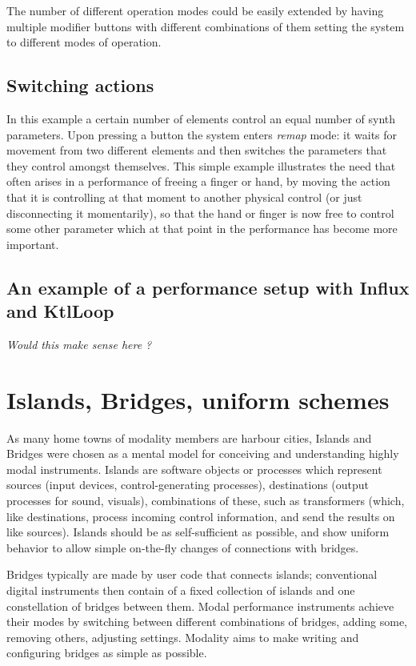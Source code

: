 \documentclass{article}
\begin{document}
The number of different operation modes could be easily extended by having multiple modifier buttons with different combinations of them setting the system to different modes of operation.
       
\subsection{Switching actions}
\label{sub:switching_actions}

In this example a certain number of elements control an equal number of synth parameters. Upon pressing a button the system enters \emph{remap} mode: it waits for movement from two different elements and then switches the parameters that they control amongst themselves. This simple example illustrates the need that often arises in a performance of freeing a finger or hand, by moving the action that it is controlling at that moment to another physical control (or just disconnecting it momentarily), so that the hand or finger is now free to control some other parameter which at that point in the performance has become more important. 

\subsection{An example of a performance setup with Influx and KtlLoop}

\emph{Would this make sense here ?}


\section{Islands, Bridges, uniform schemes}
\label{sec:islands_and_bridges_uniform_protocols}
As many home towns of modality members are harbour cities, Islands and Bridges were chosen as a mental model for conceiving and understanding highly modal instruments.
Islands are software objects or processes which represent sources (input devices, control-generating processes), destinations (output processes for sound, visuals), combinations of these, such as transformers (which, like destinations, process incoming control information, and send the results on like sources). 
Islands should be as self-sufficient as possible, and show uniform behavior to allow simple on-the-fly changes of connections with bridges. 

Bridges typically are made by user code that connects islands; conventional digital instruments then contain of a fixed collection of islands and one constellation of bridges between them. Modal performance instruments achieve their modes by switching between different combinations of bridges, adding some, removing others, adjusting settings. 
Modality aims to make writing and configuring bridges as simple as possible. 
\end{document}
